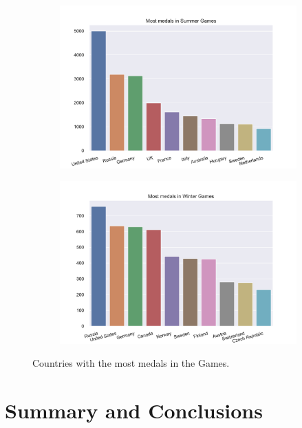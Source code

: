 \documentclass[11pt]{article} %
\begin{document}
\begin{figure}
    \centering
    \begin{subfigure}{0.5\textwidth}
    \hspace{-17mm}
    \includegraphics[scale=0.45]{Most_medals_summer_countries.pdf}
    \end{subfigure}%
    \begin{subfigure}{0.5\textwidth}
    \includegraphics[scale=0.45]{Most_medals_winter_countries.pdf}
    \end{subfigure}
    \caption{Countries with the most medals in the Games.}
\end{figure}

\section{Summary and Conclusions}
\end{document}
